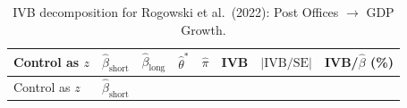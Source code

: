 \documentclass[
]{article}
\begin{document}
\begin{longtable}[]{@{}
  >{\raggedright\arraybackslash}p{}
  >{\raggedleft\arraybackslash}p{}
  >{\raggedleft\arraybackslash}p{}
  >{\raggedleft\arraybackslash}p{}
  >{\raggedleft\arraybackslash}p{}
  >{\raggedleft\arraybackslash}p{}
  >{\raggedleft\arraybackslash}p{}
  >{\raggedleft\arraybackslash}p{}@{}}
\caption{IVB decomposition for Rogowski et al.~(2022): Post Offices
\(\to\) GDP Growth.}\tabularnewline
\toprule\noalign{}
\begin{minipage}[b]{\linewidth}\raggedright
Control as \(z\)
\end{minipage} & \begin{minipage}[b]{\linewidth}\raggedleft
\(\hat\beta_{\text{short}}\)
\end{minipage} & \begin{minipage}[b]{\linewidth}\raggedleft
\(\hat\beta_{\text{long}}\)
\end{minipage} & \begin{minipage}[b]{\linewidth}\raggedleft
\(\hat\theta^*\)
\end{minipage} & \begin{minipage}[b]{\linewidth}\raggedleft
\(\hat\pi\)
\end{minipage} & \begin{minipage}[b]{\linewidth}\raggedleft
IVB
\end{minipage} & \begin{minipage}[b]{\linewidth}\raggedleft
\(\lvert\text{IVB}/\text{SE}\rvert\)
\end{minipage} & \begin{minipage}[b]{\linewidth}\raggedleft
IVB/\(\hat\beta\) (\%)
\end{minipage} \\
\midrule\noalign{}
\endfirsthead
\toprule\noalign{}
\begin{minipage}[b]{\linewidth}\raggedright
Control as \(z\)
\end{minipage} & \begin{minipage}[b]{\linewidth}\raggedleft
\(\hat\beta_{\text{short}}\)
\end{minipage} & \begin{minipage}[b]{\linewidth}\raggedleft

\end{minipage}
\end{longtable}
\end{document}
